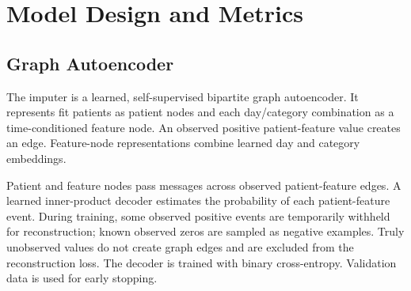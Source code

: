 \documentclass[11pt]{article}
\begin{document}
\section{Model Design and Metrics}

\subsection{Graph Autoencoder}

The imputer is a learned, self-supervised bipartite graph autoencoder.
It represents fit patients as patient nodes and each day/category
combination as a time-conditioned feature node. An observed positive
patient-feature value creates an edge. Feature-node representations combine
learned day and category embeddings.

Patient and feature nodes pass messages across observed patient-feature
edges. A learned inner-product decoder estimates the probability of each
patient-feature event. During training, some observed positive events are
temporarily withheld for reconstruction; known observed zeros are sampled
as negative examples. Truly unobserved values do not create graph edges
and are excluded from the reconstruction loss. The decoder is trained with
binary cross-entropy. Validation data is used for early stopping.
\end{document}
